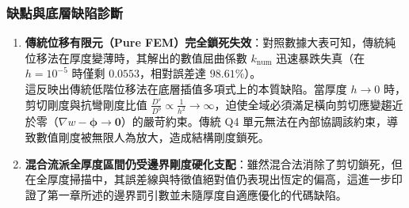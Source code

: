 \subsubsection{缺點與底層缺陷診斷}
\begin{enumerate}
    \item \textbf{傳統位移有限元（Pure FEM）完全鎖死失效}：對照數據大表可知，傳統純位移法在厚度變薄時，其解出的數值屈曲係數 $k_{\mathrm{num}}$ 迅速暴跌失真（在 $h = 10^{-5}$ 時僅剩 $0.0553$，相對誤差達 $98.61\%$）。\\
    這反映出傳統低階位移法在底層插值多項式上的本質缺陷。當厚度 $h \to 0$ 時，剪切剛度與抗彎剛度比值 $\frac{D^s}{D^b} \propto \frac{1}{h^2} \to \infty$，迫使全域必須滿足橫向剪切應變趨近於零（$\nabla w - \boldsymbol{\phi} \to \mathbf{0}$）的嚴苛約束。傳統 Q4 單元無法在內部協調該約束，導致數值剛度被無限人為放大，造成結構剛度鎖死。
    \item \textbf{混合流派全厚度區間仍受邊界剛度硬化支配}：雖然混合法消除了剪切鎖死，但在全厚度掃描中，其誤差線與特徵值絕對值仍表現出恆定的偏高，這進一步印證了第一章所述的邊界罰引數並未隨厚度自適應優化的代碼缺陷。
\end{enumerate}